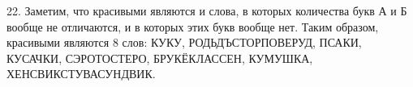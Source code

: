 22. Заметим, что красивыми являются и слова, в которых количества букв А и Б вообще не отличаются, и в которых этих букв вообще нет. Таким образом, красивыми являются 8 слов: КУКУ, РОДЬДЪСТОРПОВЕРУД, ПСАКИ, КУСАЧКИ, СЭРОТОСТЕРО, БРУКЁКЛАССЕН, КУМУШКА, ХЕНСВИКСТУВАСУНДВИК.\\
